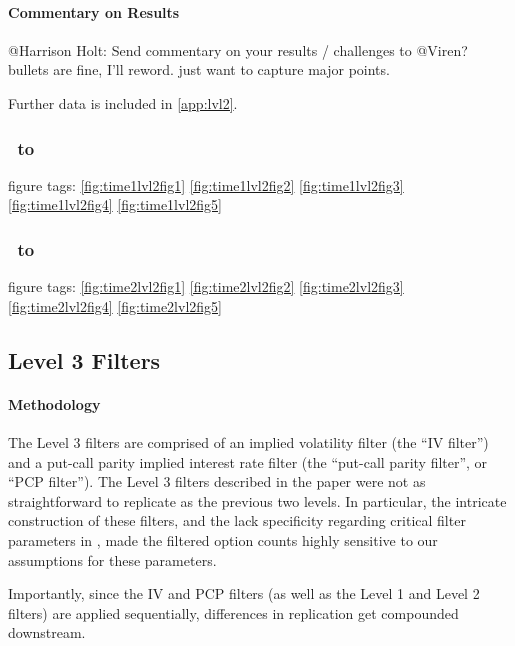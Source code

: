 \paragraph{Commentary on Results}

@{Harrison Holt}: Send commentary on your results / challenges to @Viren? bullets are fine, I'll reword. just want to capture major points.

Further data is included in \autoref{app:lvl2}. 


\subsubsection{\STARTONE\ to \ENDONE }
figure tags: 
\autoref{fig:time1lvl2fig1}
\autoref{fig:time1lvl2fig2}
\autoref{fig:time1lvl2fig3}
\autoref{fig:time1lvl2fig4}
\autoref{fig:time1lvl2fig5}

\subsubsection{\STARTTWO\ to \ENDTWO }
figure tags: 
\autoref{fig:time2lvl2fig1}
\autoref{fig:time2lvl2fig2}
\autoref{fig:time2lvl2fig3}
\autoref{fig:time2lvl2fig4}
\autoref{fig:time2lvl2fig5}


\subsection{Level 3 Filters} 

\paragraph{Methodology}
The Level 3 filters are comprised of an implied volatility filter (the ``IV filter'') and a put-call parity implied interest rate filter (the ``put-call parity filter'', or ``PCP filter''). The Level 3 filters described in the paper were not as straightforward to replicate as the previous two levels. In particular, the intricate construction of these filters, and the lack specificity regarding critical filter parameters in \citet{constantinides2013}, made the filtered option counts highly sensitive to our assumptions for these parameters. 

Importantly, since the IV and PCP filters (as well as the Level 1 and Level 2 filters) are applied sequentially, differences in replication get compounded downstream.

